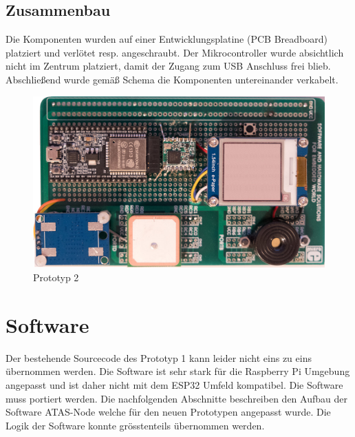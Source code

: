 \documentclass[11pt,english,german]{report}
\theoremstyle{definition}
\begin{document}
\newpage
\subsection{Zusammenbau}
Die Komponenten wurden auf einer Entwicklungsplatine (PCB Breadboard) platziert und verlötet resp. angeschraubt. Der Mikrocontroller wurde absichtlich nicht im Zentrum platziert, damit der Zugang zum USB Anschluss frei blieb. Abschließend wurde gemäß Schema die Komponenten untereinander verkabelt.\\
\begin{figure}[H]
	\centering
	\includegraphics[width=\textwidth]{img/prototype/prototyp2.jpg}
	\caption[Prototyp 2]
	{Prototyp 2}
\end{figure}

\newpage
\section{Software}
Der bestehende Sourcecode des Prototyp 1 kann leider nicht eins zu eins übernommen werden. Die Software ist sehr stark für die Raspberry Pi Umgebung angepasst und ist daher nicht mit dem ESP32 Umfeld kompatibel. Die Software muss portiert werden. Die nachfolgenden Abschnitte beschreiben den Aufbau der Software ATAS-Node welche für den neuen Prototypen angepasst wurde. Die Logik der Software konnte grösstenteils übernommen werden. 
\end{document}
